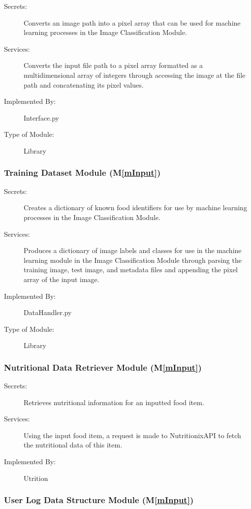 \documentclass[12pt, titlepage]{article}
\newcommand{\mref}[1]{M\ref{#1}}
\begin{document}
\begin{description}
\item[Secrets:] Converts an image path into a pixel array that can be used for machine learning processes in the Image Classification Module.
\item[Services:] Converts the input file path to a pixel array formatted as a multidimensional array of integers through accessing the image at the file path and concatenating its pixel values.
\item[Implemented By:] Interface.py
\item[Type of Module:] Library
\end{description}

\subsubsection{Training Dataset Module (\mref{mInput})}

\begin{description}
\item[Secrets:] Creates a dictionary of known food identifiers for use by machine learning processes in the Image Classification Module.
\item[Services:] Produces a dictionary of image labels and classes for use in the machine learning module in the Image Classification Module through parsing the training image, test image, and metadata files and appending the pixel array of the input image.
\item[Implemented By:] DataHandler.py
\item[Type of Module:] Library
\end{description}

\subsubsection{Nutritional Data Retriever Module (\mref{mInput})}

\begin{description}
	\item[Secrets:]Retrieves nutritional information for an inputted food item.
	\item[Services:]Using the input food item, a request is made to NutritionixAPI to fetch the nutritional data of this item.
	\item[Implemented By:] Utrition
\end{description}

\subsubsection{User Log Data Structure Module (\mref{mInput})}
\end{document}
